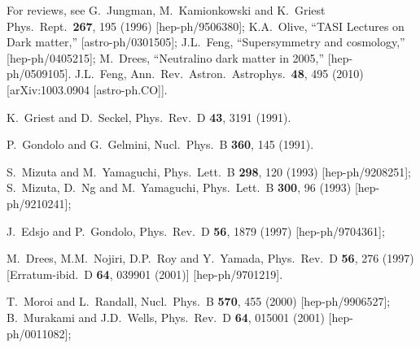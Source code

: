 \documentclass[12pt]{article}
\begin{document}
\begin{thebibliography}{999}
 For reviews, see
G.~Jungman, M.~Kamionkowski and K.~Griest   
  Phys.\ Rept.\  {\bf 267}, 195 (1996)
  [hep-ph/9506380];
K.A.~Olive,
  ``TASI Lectures on Dark matter,''
  [astro-ph/0301505];
J.L.~Feng,
  ``Supersymmetry and cosmology,'' 
  [hep-ph/0405215];
M.~Drees,
  ``Neutralino dark matter in 2005,''
  [hep-ph/0509105].
J.L.~Feng,
  Ann.\ Rev.\ Astron.\ Astrophys.\  {\bf 48}, 495 (2010)
  [arXiv:1003.0904 [astro-ph.CO]].

K.~Griest and D.~Seckel,
  Phys.\ Rev.\ D {\bf 43}, 3191 (1991).

  P.~Gondolo and G.~Gelmini,
  Nucl.\ Phys.\ B {\bf 360}, 145 (1991).

S.~Mizuta and M.~Yamaguchi,
  Phys.\ Lett.\ B {\bf 298}, 120 (1993)
  [hep-ph/9208251];
S.~Mizuta, D.~Ng and M.~Yamaguchi,
  Phys.\ Lett.\ B {\bf 300}, 96 (1993)
  [hep-ph/9210241];

J.~Edsjo and P.~Gondolo,
  Phys.\ Rev.\ D {\bf 56}, 1879 (1997)
  [hep-ph/9704361];

M.~Drees, M.M.~Nojiri, D.P.~Roy and Y.~Yamada,
  Phys.\ Rev.\ D {\bf 56}, 276 (1997)
  [Erratum-ibid.\ D {\bf 64}, 039901 (2001)]
  [hep-ph/9701219].
  
T.~Moroi and L.~Randall,
  Nucl.\ Phys.\ B {\bf 570}, 455 (2000)
  [hep-ph/9906527];
B.~Murakami and J.D.~Wells,
  Phys.\ Rev.\ D {\bf 64}, 015001 (2001)
  [hep-ph/0011082];


\end{thebibliography}
\end{document}
